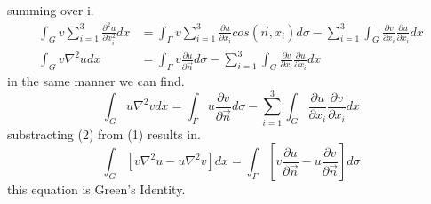 \documentclass[]{article}
\begin{document}
summing over i.
\begin{align}
\int_G v\sum_{i=1}^{3}\frac{\partial^2 u}{\partial x_{i}^{2}} dx &= \int_\Gamma v\sum_{i=1}^{3}\frac{\partial u}{\partial x_i}cos(\vec{n},x_i) d\sigma - \sum_{i=1}^{3}\int_G \frac{\partial v}{\partial x_i}\frac{\partial u}{\partial x_i} dx 
\nonumber
\\ 
\int_G v\nabla^2 u dx &= \int_\Gamma v\frac{\partial u}{\partial \vec{n}} d\sigma - \sum_{i=1}^{3}\int_G \frac{\partial v}{\partial x_i}\frac{\partial u}{\partial x_i} dx
\end{align}
in the same manner we can find.
\begin{equation}
\int_G u\nabla^2 v dx = \int_\Gamma u\frac{\partial v}{\partial \vec{n}} d\sigma - \sum_{i=1}^{3}\int_G \frac{\partial u}{\partial x_i}\frac{\partial v}{\partial x_i} dx
\end{equation}
substracting (2) from (1) results in.
\[
    \int_G \left[v\nabla^2 u - u\nabla^2 v\right]dx = \int_\Gamma \left[v\frac{\partial u}{\partial \vec{n}}-u\frac{\partial v}{\partial \vec{n}}\right] d\sigma    
\]
this equation is Green's Identity.
\end{document}
